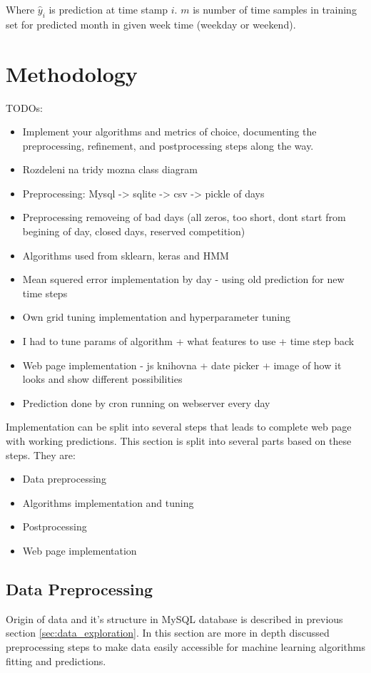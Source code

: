\documentclass{article}
\begin{document}
Where $\hat{y}_i$ is prediction at time stamp $i$. $m$ is number of time samples in training set for predicted month in given week time (weekday or weekend).

\section{Methodology}

\color{red}
TODOs:
\begin{itemize}
    \item Implement your algorithms and metrics of choice, documenting the preprocessing, refinement, and postprocessing steps along the way.
    \item Rozdeleni na tridy mozna class diagram
    \item Preprocessing: Mysql -> sqlite -> csv -> pickle of days
    \item Preprocessing removeing of bad days (all zeros, too short, dont start from begining of day, closed days, reserved competition)
    \item Algorithms used from sklearn, keras and HMM
    \item Mean squered error implementation by day - using old prediction for new time steps
    \item Own grid tuning implementation and hyperparameter tuning
    \item I had to tune params of algorithm + what features to use + time step back
    \item Web page implementation - js knihovna + date picker + image of how it looks and show different possibilities
    \item Prediction done by cron running on webserver every day
\end{itemize}
\color{black}

Implementation can be split into several steps that leads to complete web page with working predictions. This section is split into several parts based on these steps. They are:
\begin{itemize}
    \item Data preprocessing
    \item Algorithms implementation and tuning
    \item Postprocessing 
    \item Web page implementation 
\end{itemize}

\subsection{Data Preprocessing} \label{sec:data_preprocessing}
Origin of data and it's structure in MySQL database is described in previous section \ref{sec:data_exploration}. In this section are more in depth discussed preprocessing steps to make data easily accessible for machine learning algorithms fitting and predictions.
\end{document}
